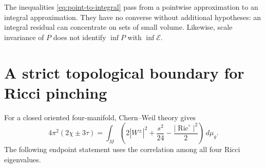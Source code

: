\documentclass[11pt,a4paper]{article}
\theoremstyle{definition}\newtheorem{definition}[theorem]{Definition}
\theoremstyle{remark}\newtheorem{remark}[theorem]{Remark}
\DeclareMathOperator{\Ric}{Ric}
\newcommand{\dd}{\,d\mu_g}
\newcommand{\Riczero}{\Ric^{\circ}}
\newcommand{\Ecal}{\mathcal E}
\begin{document}
The inequalities \eqref{eq:point-to-integral} pass from a pointwise approximation to an integral approximation. They have no converse without additional hypotheses: an integral residual can concentrate on sets of small volume. Likewise, scale invariance of $P$ does not identify $\inf P$ with $\inf\Ecal$.

\section{A strict topological boundary for Ricci pinching}
For a closed oriented four-manifold, Chern--Weil theory gives
\begin{equation}\label{eq:CW}
 4\pi^2(2\chi\pm3\tau)
 =\int_M\left(2|W^\pm|^2+\frac{s^2}{24}
                                      -\frac{|\Riczero|^2}{2}\right)\dd.
\end{equation}
The following endpoint statement uses the correlation among all four Ricci eigenvalues.
\end{document}

